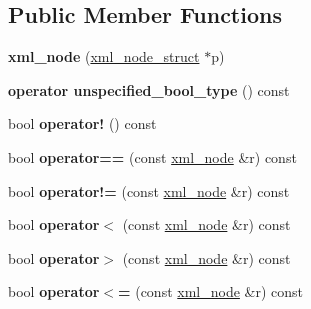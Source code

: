 \subsection*{Public Member Functions}
\begin{DoxyCompactItemize}
\item 
\hypertarget{classpugi_1_1xml__node_afc9b1ed8891dfed9ce5ab5288a9ad4a1}{{\bfseries xml\-\_\-node} (\hyperlink{structpugi_1_1xml__node__struct}{xml\-\_\-node\-\_\-struct} $\ast$p)}\label{classpugi_1_1xml__node_afc9b1ed8891dfed9ce5ab5288a9ad4a1}

\item 
\hypertarget{classpugi_1_1xml__node_af30001c73a3454a1e3794a850d3963c0}{{\bfseries operator unspecified\-\_\-bool\-\_\-type} () const }\label{classpugi_1_1xml__node_af30001c73a3454a1e3794a850d3963c0}

\item 
\hypertarget{classpugi_1_1xml__node_a03c028fd83e07cda3f433f9eea3466ff}{bool {\bfseries operator!} () const }\label{classpugi_1_1xml__node_a03c028fd83e07cda3f433f9eea3466ff}

\item 
\hypertarget{classpugi_1_1xml__node_aaf46fa45a1a117ca95867f37ade363c2}{bool {\bfseries operator==} (const \hyperlink{classpugi_1_1xml__node}{xml\-\_\-node} \&r) const }\label{classpugi_1_1xml__node_aaf46fa45a1a117ca95867f37ade363c2}

\item 
\hypertarget{classpugi_1_1xml__node_aa31095e51422a8a11b8d4832e0db71ed}{bool {\bfseries operator!=} (const \hyperlink{classpugi_1_1xml__node}{xml\-\_\-node} \&r) const }\label{classpugi_1_1xml__node_aa31095e51422a8a11b8d4832e0db71ed}

\item 
\hypertarget{classpugi_1_1xml__node_a2a57731a8d90392f88febf551bd5a924}{bool {\bfseries operator$<$} (const \hyperlink{classpugi_1_1xml__node}{xml\-\_\-node} \&r) const }\label{classpugi_1_1xml__node_a2a57731a8d90392f88febf551bd5a924}

\item 
\hypertarget{classpugi_1_1xml__node_a983e49938a893181fd8cc905c4c67f64}{bool {\bfseries operator$>$} (const \hyperlink{classpugi_1_1xml__node}{xml\-\_\-node} \&r) const }\label{classpugi_1_1xml__node_a983e49938a893181fd8cc905c4c67f64}

\item 
\hypertarget{classpugi_1_1xml__node_a09568e579d8c1b6bff12594bfb4246b6}{bool {\bfseries operator$<$=} (const \hyperlink{classpugi_1_1xml__node}{xml\-\_\-node} \&r) const }\label{classpugi_1_1xml__node_a09568e579d8c1b6bff12594bfb4246b6}


\end{DoxyCompactItemize}
